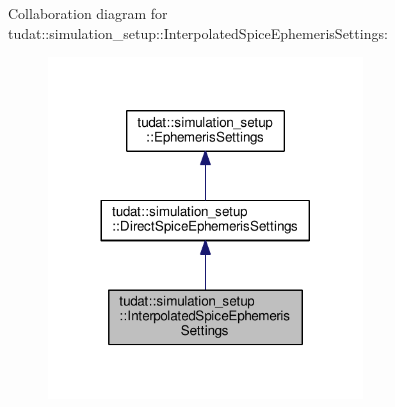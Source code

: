 Collaboration diagram for tudat\+:\+:simulation\+\_\+setup\+:\+:Interpolated\+Spice\+Ephemeris\+Settings\+:
\nopagebreak
\begin{figure}[H]
\begin{center}
\leavevmode
\includegraphics[width=236pt]{classtudat_1_1simulation__setup_1_1InterpolatedSpiceEphemerisSettings__coll__graph}
\end{center}
\end{figure}
